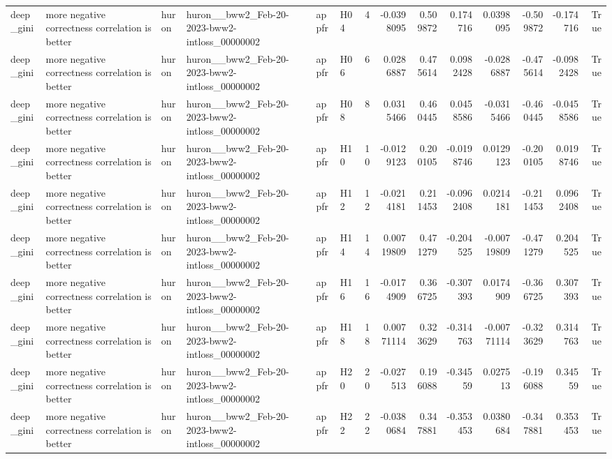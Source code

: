 \begin{longtable}{llllllrrrrrrrr}
deep\_gini & more negative correctness correlation is better & huron & huron\_\_bww2\_Feb-20-2023-bww2-intloss\_00000002 & appfr & H04 & 4 & -0.0398095 & 0.509872 & 0.174716 & 0.0398095 & -0.509872 & -0.174716 & True \\
deep\_gini & more negative correctness correlation is better & huron & huron\_\_bww2\_Feb-20-2023-bww2-intloss\_00000002 & appfr & H06 & 6 & 0.0286887 & 0.475614 & 0.0982428 & -0.0286887 & -0.475614 & -0.0982428 & True \\
deep\_gini & more negative correctness correlation is better & huron & huron\_\_bww2\_Feb-20-2023-bww2-intloss\_00000002 & appfr & H08 & 8 & 0.0315466 & 0.460445 & 0.0458586 & -0.0315466 & -0.460445 & -0.0458586 & True \\
deep\_gini & more negative correctness correlation is better & huron & huron\_\_bww2\_Feb-20-2023-bww2-intloss\_00000002 & appfr & H10 & 10 & -0.0129123 & 0.200105 & -0.0198746 & 0.0129123 & -0.200105 & 0.0198746 & True \\
deep\_gini & more negative correctness correlation is better & huron & huron\_\_bww2\_Feb-20-2023-bww2-intloss\_00000002 & appfr & H12 & 12 & -0.0214181 & 0.211453 & -0.0962408 & 0.0214181 & -0.211453 & 0.0962408 & True \\
deep\_gini & more negative correctness correlation is better & huron & huron\_\_bww2\_Feb-20-2023-bww2-intloss\_00000002 & appfr & H14 & 14 & 0.00719809 & 0.471279 & -0.204525 & -0.00719809 & -0.471279 & 0.204525 & True \\
deep\_gini & more negative correctness correlation is better & huron & huron\_\_bww2\_Feb-20-2023-bww2-intloss\_00000002 & appfr & H16 & 16 & -0.0174909 & 0.366725 & -0.307393 & 0.0174909 & -0.366725 & 0.307393 & True \\
deep\_gini & more negative correctness correlation is better & huron & huron\_\_bww2\_Feb-20-2023-bww2-intloss\_00000002 & appfr & H18 & 18 & 0.00771114 & 0.323629 & -0.314763 & -0.00771114 & -0.323629 & 0.314763 & True \\
deep\_gini & more negative correctness correlation is better & huron & huron\_\_bww2\_Feb-20-2023-bww2-intloss\_00000002 & appfr & H20 & 20 & -0.027513 & 0.196088 & -0.34559 & 0.027513 & -0.196088 & 0.34559 & True \\
deep\_gini & more negative correctness correlation is better & huron & huron\_\_bww2\_Feb-20-2023-bww2-intloss\_00000002 & appfr & H22 & 22 & -0.0380684 & 0.347881 & -0.353453 & 0.0380684 & -0.347881 & 0.353453 & True \\

\end{longtable}
